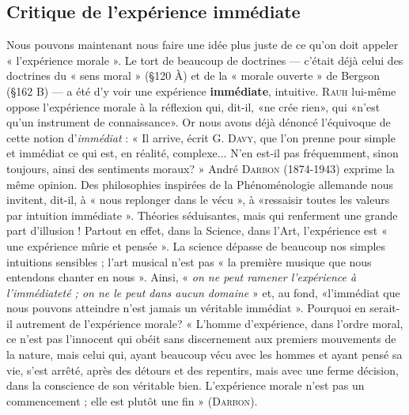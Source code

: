 \subsection{Critique de l'expérience immédiate}%
Nous pouvons
maintenant nous faire une idée plus juste de ce qu’on doit appeler
« l’expérience morale ». Le tort de beaucoup de doctrines — c'était
déjà celui des doctrines du « sens moral » (\S 120 À) et de la « morale
ouverte » de Bergson (\S 162 B) — a été d’y voir une expérience {\bf immédiate},
intuitive. \textsc{Rauh} lui-même oppose l'expérience morale à la
réflexion qui, dit-il, «ne crée rien», qui «n’est qu’un instrument
de connaissance». Or nous avons déjà dénoncé l’équivoque de
cette notion d’{\it immédiat} : « Il arrive, écrit G. \textsc{Davy}, que l’on prenne
pour simple et immédiat ce qui est, en réalité, complexe... N'en
est-il pas fréquemment, sinon toujours, ainsi des sentiments
moraux? » André \textsc{Darbon} (1874-1943) exprime la même opinion.
Des philosophies inspirées de la Phénoménologie allemande nous
invitent, dit-il, à « nous replonger dans le vécu », à «ressaisir toutes
les valeurs par intuition immédiate ». Théories séduisantes, mais qui
renferment une grande part d’illusion ! Partout en effet, dans la
Science, dans l’Art, l'expérience est « une expérience mûrie et pensée ».
La science dépasse de beaucoup nos simples intuitions sensibles ; l’art
musical n’est pas « la première musique que nous entendons chanter
en nous ». Ainsi, « {\it on ne peut ramener l'expérience à l’immédiateté ; on ne
le peut dans aucun domaine} » et, au fond, «l’immédiat que nous pouvons
atteindre n’est jamais un véritable immédiat ». Pourquoi en
serait-il autrement de l’expérience morale? « L'homme d’expérience,
dans l’ordre moral, ce n’est pas l’innocent qui obéit sans discernement
aux premiers mouvements de la nature, mais celui qui, ayant beaucoup
vécu avec les hommes et ayant pensé sa vie, s’est arrêté, après des
détours et des repentirs, mais avec une ferme décision, dans la conscience
de son véritable bien. L'expérience morale n’est pas un commencement ;
elle est plutôt une fin » (\textsc{Darbon}).

